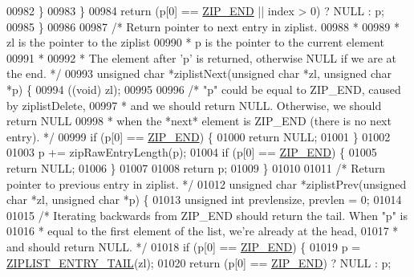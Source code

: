 \begin{DoxyCode}
{{00982         \}
00983     \}
00984     \textcolor{keywordflow}{return} (p[0] == \hyperlink{ziplist_8c_a31a8f9d5b5bad75318741cfca5de5ea8}{ZIP\_END} || index > 0) ? NULL : p;
00985 \}
00986 
00987 \textcolor{comment}{/* Return pointer to next entry in ziplist.}
00988 \textcolor{comment}{ *}
00989 \textcolor{comment}{ * zl is the pointer to the ziplist}
00990 \textcolor{comment}{ * p is the pointer to the current element}
00991 \textcolor{comment}{ *}
00992 \textcolor{comment}{ * The element after 'p' is returned, otherwise NULL if we are at the end. */}
00993 \textcolor{keywordtype}{unsigned} \textcolor{keywordtype}{char} *ziplistNext(\textcolor{keywordtype}{unsigned} \textcolor{keywordtype}{char} *zl, \textcolor{keywordtype}{unsigned} \textcolor{keywordtype}{char} *p) \{
00994     ((\textcolor{keywordtype}{void}) zl);
00995 
00996     \textcolor{comment}{/* "p" could be equal to ZIP\_END, caused by ziplistDelete,}
00997 \textcolor{comment}{     * and we should return NULL. Otherwise, we should return NULL}
00998 \textcolor{comment}{     * when the *next* element is ZIP\_END (there is no next entry). */}
00999     \textcolor{keywordflow}{if} (p[0] == \hyperlink{ziplist_8c_a31a8f9d5b5bad75318741cfca5de5ea8}{ZIP\_END}) \{
01000         \textcolor{keywordflow}{return} NULL;
01001     \}
01002 
01003     p += zipRawEntryLength(p);
01004     \textcolor{keywordflow}{if} (p[0] == \hyperlink{ziplist_8c_a31a8f9d5b5bad75318741cfca5de5ea8}{ZIP\_END}) \{
01005         \textcolor{keywordflow}{return} NULL;
01006     \}
01007 
01008     \textcolor{keywordflow}{return} p;
01009 \}
01010 
01011 \textcolor{comment}{/* Return pointer to previous entry in ziplist. */}
01012 \textcolor{keywordtype}{unsigned} \textcolor{keywordtype}{char} *ziplistPrev(\textcolor{keywordtype}{unsigned} \textcolor{keywordtype}{char} *zl, \textcolor{keywordtype}{unsigned} \textcolor{keywordtype}{char} *p) \{
01013     \textcolor{keywordtype}{unsigned} \textcolor{keywordtype}{int} prevlensize, prevlen = 0;
01014 
01015     \textcolor{comment}{/* Iterating backwards from ZIP\_END should return the tail. When "p" is}
01016 \textcolor{comment}{     * equal to the first element of the list, we're already at the head,}
01017 \textcolor{comment}{     * and should return NULL. */}
01018     \textcolor{keywordflow}{if} (p[0] == \hyperlink{ziplist_8c_a31a8f9d5b5bad75318741cfca5de5ea8}{ZIP\_END}) \{
01019         p = \hyperlink{ziplist_8c_a13a02cab4315ab94186102584601273e}{ZIPLIST\_ENTRY\_TAIL}(zl);
01020         \textcolor{keywordflow}{return} (p[0] == \hyperlink{ziplist_8c_a31a8f9d5b5bad75318741cfca5de5ea8}{ZIP\_END}) ? NULL : p;
}}
\end{DoxyCode}
